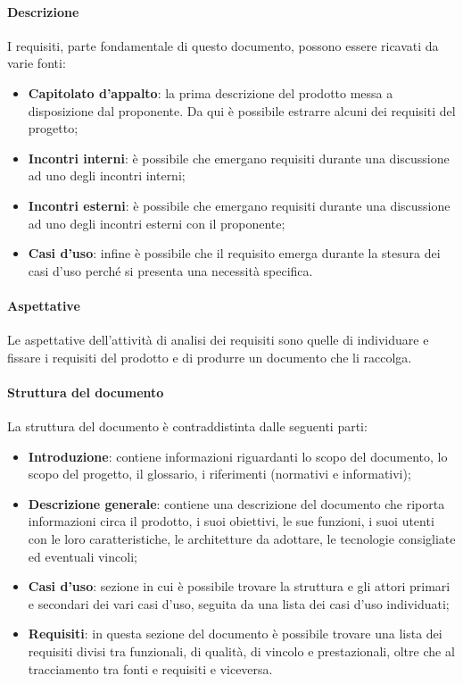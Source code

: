 \paragraph{Descrizione}

I requisiti, parte fondamentale di questo documento, possono essere ricavati da varie fonti:
\begin{itemize}
    \item \textbf{Capitolato d'appalto}: la prima descrizione del prodotto messa a disposizione dal proponente. Da qui 
    è possibile estrarre alcuni dei requisiti del progetto;
    \item \textbf{Incontri interni}: è possibile che emergano requisiti durante una discussione ad uno degli incontri interni;
    \item \textbf{Incontri esterni}: è possibile che emergano requisiti durante una discussione ad uno degli incontri esterni con il proponente;
    \item \textbf{Casi d'uso}: infine è possibile che il requisito emerga durante la stesura dei casi d'uso perché si 
    presenta una necessità specifica.
\end{itemize}

\paragraph{Aspettative}

Le aspettative dell'attività di analisi dei requisiti sono quelle di individuare e fissare i requisiti del prodotto e di 
produrre un documento che li raccolga.

\paragraph{Struttura del documento}

La struttura del documento è contraddistinta dalle seguenti parti:
\begin{itemize}
    \item \textbf{Introduzione}: contiene informazioni riguardanti lo scopo del documento, lo scopo del progetto, il 
    glossario, i riferimenti (normativi e informativi);
    \item \textbf{Descrizione generale}: contiene una descrizione del documento che riporta informazioni circa il 
    prodotto, i suoi obiettivi, le sue funzioni, i suoi utenti con le loro caratteristiche, le architetture da adottare, 
    le tecnologie consigliate ed eventuali vincoli;
    \item \textbf{Casi d'uso}: sezione in cui è possibile trovare la struttura e gli attori primari e secondari dei vari 
    casi d'uso, seguita da una lista dei casi d'uso individuati;
    \item \textbf{Requisiti}: in questa sezione del documento è possibile trovare una lista dei requisiti divisi tra 
    funzionali, di qualità, di vincolo e prestazionali, oltre che al tracciamento tra fonti e requisiti e viceversa.
\end{itemize}

